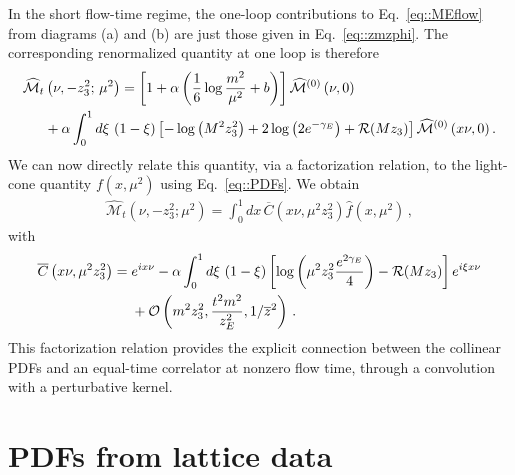 In the short flow-time regime, the one-loop contributions to Eq.~\eqref{eq::MEflow} from diagrams (a) and (b) are just those given in Eq.~\eqref{eq::zmzphi}. The corresponding
renormalized quantity at one loop is therefore
\begin{align}
\label{eq::tIoffe1loopren}
    \widehat{\mathcal{M}}_t&\left(\nu, -z_3^2;\,\mu^2\right) =
    \left[1+ \alpha\left(\frac{1}{6}\log\frac{m^2}{\mu^2} + b\right)  \right]\widehat{\mathcal{M}}^{(0)}\left(\nu, 0\right) \nonumber \\
    &+\alpha \int_0^1 d\xi\,\left(1-\xi\right)
    \left[-\log\left( M^2 z_3^2\right)+ 2 \log\left(2e^{-\gamma_E}\right) + {\cal R}(Mz_3)\right] \widehat{\mathcal{M}}^{(0)}\left(x \nu, 0\right) .
\end{align}
We can now directly relate this quantity, via a factorization relation, to the light-cone quantity $f(x,\mu^2)$ using Eq.~\eqref{eq::PDFs}. We obtain
\begin{align}
	\label{eq::factt}
	\widehat{\mathcal{M}}_t\left(\nu, -z_3^2; \mu^2\right) = 
	\int_{0}^{1} dx\,\overline{C}\left(x\nu, \mu^2 z_3^2 \right) \widehat{f}\left(x,\mu^2\right)\, ,
\end{align}
with
\begin{align}
	\label{eq::Cpseudot}
	\overline{C}\left(x\nu,\mu^2 z_3^2 \right) = {} & 
	 e^{i x\nu} - \alpha\int_0^1 d\xi \, 
	 \left(1-\xi\right) \left[
	 \log\left( \mu^2 z_3^2\frac{e^{2\gamma_E}}{4} \right) - {\cal R}(Mz_3)\right] e^{i \xi x\nu} \nonumber \\
         & {} + \mathcal{O}\left(m^2 z_3^2,\frac{t^2 m^2}{z_E^2},
                1/\overline{z}^2\right)\, .
\end{align}
This factorization relation provides the explicit connection between the collinear PDFs and an
equal-time correlator at nonzero flow time, through a convolution with a perturbative kernel.

  
\section{PDFs from lattice data}
\label{sec:conclusion}

